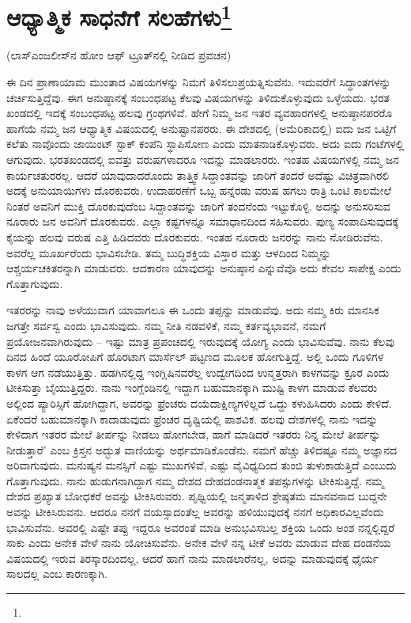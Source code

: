 
\chapter[ಆಧ್ಯಾತ್ಮಿಕ ಸಾಧನೆಗೆ ಸಲಹೆಗಳು]{ಆಧ್ಯಾತ್ಮಿಕ ಸಾಧನೆಗೆ ಸಲಹೆಗಳು\protect\footnote{}}

\begin{center}
(ಲಾಸ್‌ಎಂಜಲೀಸ್‌ನ ಹೋಂ ಆಫ್ ಟ್ರೂತ್‌ನಲ್ಲಿ ನೀಡಿದ ಪ್ರವಚನ)
\end{center}

ಈ ದಿನ ಪ್ರಾಣಾಯಾಮ ಮುಂತಾದ ವಿಷಯಗಳನ್ನು ನಿಮಗೆ ತಿಳಿಸಲು\break ಪ್ರಯತ್ನಿಸುವೆನು. ಇದುವರೆಗೆ ಸಿದ್ಧಾಂತಗಳನ್ನು ಚರ್ಚಿಸುತ್ತಿದ್ದೆವು. ಈಗ ಅನುಷ್ಠಾನಕ್ಕೆ ಸಂಬಂಧಪಟ್ಟ ಕೆಲವು ವಿಷಯಗಳನ್ನು ತಿಳಿದುಕೊಳ್ಳುವುದು ಒಳ್ಳೆಯದು. ಭರತ ಖಂಡದಲ್ಲಿ ಇದಕ್ಕೆ ಸಂಬಂಧಪಟ್ಟ ಹಲವು ಗ್ರಂಥಗಳಿವೆ. ಹೇಗೆ ನಿಮ್ಮ ಜನ ಇತರ ವ್ಯವಹಾರಗಳಲ್ಲಿ ಅನುಷ್ಠಾನಪರರೊ ಹಾಗೆಯೆ ನಮ್ಮ ಜನ ಆಧ್ಯಾತ್ಮಿಕ ವಿಷಯದಲ್ಲಿ ಅನುಷ್ಟಾನಪರರು. ಈ ದೇಶದಲ್ಲಿ (ಅಮೆರಿಕಾದಲ್ಲಿ) ಐದು ಜನ ಒಟ್ಟಿಗೆ ಕಲೆತು ನಾವೊಂದು ಜಾಯಿಂಟ್ ಸ್ಟಾಕ್ ಕಂಪೆನಿ ಸ್ಥಾಪಿಸೋಣ ಎಂದು ಮಾತನಾಡಿಕೊಳ್ಳುವರು. ಅದು ಐದು ಗಂಟೆಗಳಲ್ಲಿ ಆಗುವುದು. ಭರತಖಂಡದಲ್ಲಿ ಐವತ್ತು ವರುಷಗಳಾದರೂ ಇದನ್ನು ಮಾಡಲಾರರು. ಇಂತಹ ವಿಷಯಗಳಲ್ಲಿ ನಮ್ಮ ಜನ ಕಾರ್ಯಚತುರರಲ್ಲ. ಆದರೆ ಯಾವುದಾದರೊಂದು ತಾತ್ತ್ವಿಕ ಸಿದ್ದಾಂತವನ್ನು ಜಾರಿಗೆ ತಂದರೆ ಅದೆಷ್ಟು ವಿಚಿತ್ರವಾಗಿರಲಿ ಅದಕ್ಕೆ ಅನುಯಾಯಿಗಳು ದೊರಕುವರು. ಉದಾಹರಣೆಗೆ ಒಬ್ಬ ಹನ್ನೆರಡು ವರುಷ ಹಗಲು ರಾತ್ರಿ ಒಂಟಿ ಕಾಲಮೇಲೆ ನಿಂತರೆ ಅವನಿಗೆ ಮುಕ್ತಿ ದೊರಕುವುದೆಂಬ ಸಿದ್ದಾಂತವನ್ನು ಜಾರಿಗೆ ತಂದನೆಂದು ಇಟ್ಟುಕೊಳ್ಳಿ. ಅದನ್ನು ಅನುಸರಿಸುವ ನೂರಾರು ಜನ ಅವನಿಗೆ ದೊರಕುವರು. ಎಲ್ಲಾ ಕಷ್ಟಗಳನ್ನೂ ಸಮಾಧಾನದಿಂದ ಸಹಿಸುವರು. ಪುಣ್ಯ ಸಂಪಾದಿಸುವುದಕ್ಕೆ ಕೈಯನ್ನು ಹಲವು ವರುಷ ಎತ್ತಿ ಹಿಡಿದವರು ದೊರಕುವರು. ಇಂತಹ ನೂರಾರು ಜನರನ್ನು ನಾನು ನೋಡಿರುವೆನು. ಅವರೆಲ್ಲ ಮೂರ್ಖರೆಂದು ಭಾವಿಸಬೇಡಿ. ತಮ್ಮ ಬುದ್ಧಿಶಕ್ತಿಯ ವಿಸ್ತಾರ ಮತ್ತು ಆಳದಿಂದ ನಿಮ್ಮನ್ನು ಆಶ್ಚರ್ಯಚಕಿತರನ್ನಾಗಿ ಮಾಡುವರು. ಆದಕಾರಣ ಯಾವುದನ್ನು ಅನುಷ್ಠಾನ ಎನ್ನುವೆವೊ ಅದು ಕೇವಲ ಸಾಪೇಕ್ಷ ಎಂದು ಗೊತ್ತಾಗುವುದು.

ಇತರರನ್ನು ನಾವು ಅಳೆಯುವಾಗ ಯಾವಾಗಲೂ ಈ ಒಂದು ತಪ್ಪನ್ನು ಮಾಡುವೆವು. ಅದು ನಮ್ಮ ಕಿರು ಮಾನಸಿಕ ಜಗತ್ತೇ ಸರ್ವಸ್ವ ಎಂದು ಭಾವಿಸುವುದು. ನಮ್ಮ ನೀತಿ ನಡವಳಿಕೆ, ನಮ್ಮ ಕರ್ತವ್ಯಭಾವನೆ, ನಮಗೆ ಪ್ರಯೋಜನವಾಗಿರುವುದು – ಇಷ್ಟು ಮಾತ್ರ ಪ್ರಪಂಚದಲ್ಲಿ ಇರುವುದಕ್ಕೆ ಯೋಗ್ಯ ಎಂದು ಭಾವಿಸುವೆವು. ನಾನು ಕೆಲವು ದಿನದ ಹಿಂದೆ ಯೂರೋಪಿಗೆ ಹೊರಟಾಗ ಮಾರ್ಸೆಲ್ ಪಟ್ಟಣದ ಮೂಲಕ ಹೋಗುತ್ತಿದ್ದೆ. ಅಲ್ಲಿ ಒಂದು ಗೂಳಿಗಳ ಕಾಳಗ ಆಗ ನಡೆಯುತ್ತಿತ್ತು. ಹಡಗಿನಲ್ಲಿದ್ದ ಇಂಗ್ಲಿಷಿನವರೆಲ್ಲ ಉದ್ವೇಗದಿಂದ ಉನ್ಮತ್ತರಾಗಿ ಕಾಳಗವನ್ನು ಕ್ರೂರ ಎಂದು ಟೀಕಿಸುತ್ತಾ ಬೈಯುತ್ತಿದ್ದರು. ನಾನು ಇಂಗ್ಲೆಂಡಿನಲ್ಲಿ ಇದ್ದಾಗ ಬಹುಮಾನಕ್ಕಾಗಿ ಮುಷ್ಟಿ ಕಾಳಗ ಮಾಡುವ ಕೆಲವರು ಅಲ್ಲಿಂದ ಪ್ಯಾರಿಸ್ಸಿಗೆ ಹೋಗಿದ್ದಾಗ, ಅವರನ್ನು ಫ್ರೆಂಚರು ದಯೆದಾಕ್ಷಿಣ್ಯಗಳಿಲ್ಲದೆ ಒದ್ದು ಕಳುಹಿಸಿದರು ಎಂದು ಕೇಳಿದೆ. ಏಕೆಂದರೆ ಬಹುಮಾನಕ್ಕಾಗಿ ಕಾದಾಡುವುದು ಫ್ರೆಂಚರ ದೃಷ್ಟಿಯಲ್ಲಿ ಪಾಶವಿಕ. ಹಲವು ದೇಶಗಳಲ್ಲಿ ನಾನು ಇದನ್ನು ಕೇಳಿದಾಗ ಇತರರ ಮೇಲೆ ತೀರ್ಪನ್ನು ನೀಡಲು ಹೋಗಬೇಡ, ಹಾಗೆ ಮಾಡಿದರೆ ಇತರರು ನಿನ್ನ ಮೇಲೆ ತೀರ್ಪನ್ನು ನೀಡುತ್ತಾರೆ' ಎಂಬ ಕ್ರಿಸ್ತನ ಅದ್ಭುತ ವಾಣಿಯನ್ನು ಅರ್ಥಮಾಡಿಕೊಂಡೆನು. ನಮಗೆ ಹೆಚ್ಚು ತಿಳಿದಷ್ಟೂ ನಮ್ಮ ಅಜ್ಞಾನದ ಅರಿವಾಗುವುದು. ಮನುಷ್ಯನ ಮನಸ್ಸಿಗೆ ಎಷ್ಟು ಮುಖಗಳಿವೆ, ಎಷ್ಟು ವೈವಿಧ್ಯದಿಂದ ತುಂಬಿ ತುಳುಕಾಡುತ್ತಿದೆ ಎಂಬುದು ಗೊತ್ತಾಗುವುದು. ನಾನು ಹುಡುಗನಾಗಿದ್ದಾಗ ನಮ್ಮ ದೇಶದ ದೇಹದಂಡನಾತ್ಮಕ ತಪಸ್ಸುಗಳನ್ನು ಟೀಕಿಸುತ್ತಿದ್ದೆ. ನಮ್ಮ ದೇಶದ ಪ್ರಖ್ಯಾತ ಬೋಧಕರೆ ಅವನ್ನು ಟೀಕಿಸಿರುವರು. ಪೃಥ್ವಿಯಲ್ಲಿ ಜನ್ಮತಾಳಿದ ಶ್ರೇಷ್ಠತಮ ಮಾನವನಾದ ಬುದ್ದನೇ ಅವನ್ನು ಟೀಕಿಸಿರುವನು. ಆದರೂ ನನಗೆ ವಯಸ್ಸಾದಂತೆಲ್ಲ ಅವರನ್ನು ಹಳಿಯುವುದಕ್ಕೆ ನನಗೆ ಅಧಿಕಾರವಿಲ್ಲವೆಂದು ಭಾವಿಸುವೆನು. ಅವರಲ್ಲಿ ಎಷ್ಟೇ ತಪ್ಪು ಇದ್ದರೂ ಅವರಂತೆ ಮಾಡಿ ಅನುಭವಿಸಬಲ್ಲ ಶಕ್ತಿಯ ಒಂದು ಅಂಶ ನನ್ನಲ್ಲಿದ್ದರೆ ಸಾಕು ಎಂದು ಅನೇಕ ವೇಳೆ ನಾನು ಯೋಚಿಸುವೆನು. ಅನೇಕ ವೇಳೆ ನನ್ನ ಟೀಕೆ ಅವರು ಮಾಡುವ ದೇಹ ದಂಡನೆಯ ವಿಷಯದಲ್ಲಿ ಇರುವ ತಿರಸ್ಕಾರದಿಂದಲ್ಲ, ಆದರೆ ಹಾಗೆ ನಾನು ಮಾಡಲಾರೆನಲ್ಲ, ಅದನ್ನು ಮಾಡುವುದಕ್ಕೆ ಧೈರ್ಯ ಸಾಲದಲ್ಲ ಎಂಬ ಕಾರಣಕ್ಕಾಗಿ.

